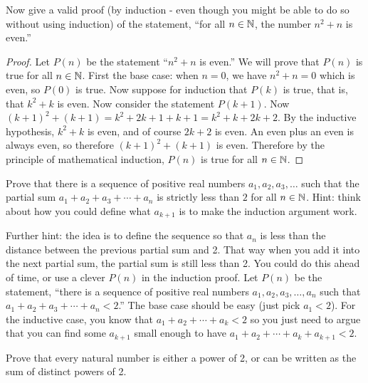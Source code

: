 \begin{questions}
  	
  	
  

\question Now give a valid proof (by induction - even though you might be able to do so without using induction) of the statement, ``for all $n \in \mathbb N$, the number $n^2 + n$ is even.''

	\begin{answer}
		  \begin{proof}
		    Let $P(n)$ be the statement ``$n^2 + n$ is even.''  We will prove that $P(n)$ is true for all $n \in \mathbb N$.  First the base case: when $n = 0$, we have $n^2 + n = 0$ which is even, so $P(0)$ is true.  Now suppose for induction that $P(k)$ is true, that is, that $k^2 + k$ is even.  Now consider the statement $P(k+1)$.  Now $(k+1)^2 + (k+1) = k^2 + 2k + 1 + k + 1 = k^2 + k + 2k + 2$.  By the inductive hypothesis, $k^2 + k$ is even, and of course $2k + 2$ is even.  An even plus an even is always even, so therefore $(k+1)^2 + (k+1)$ is even.  Therefore by the principle of mathematical induction, $P(n)$ is true for all $n \in \mathbb N$.
		  \end{proof}
	\end{answer}
	
	
	


\question Prove that there is a sequence of positive real numbers $a_1, a_2, a_3, \ldots$ such that the partial sum $a_1 + a_2 + a_3 + \cdots + a_n$ is strictly less than $2$ for all $n \in \mathbb N$.  Hint: think about how you could define what $a_{k+1}$ is to make the induction argument work.

	\begin{answer}
		 Further hint: the idea is to define the sequence so that $a_n$ is less than the distance between the previous partial sum and 2.  That way when you add it into the next partial sum, the partial sum is still less than 2.  You could do this ahead of time, or use a clever $P(n)$ in the induction proof.  Let $P(n)$ be the statement, ``there is a sequence of positive real numbers $a_1, a_2, a_3, \ldots, a_n$ such that $a_1 + a_2 + a_3 + \cdots + a_n < 2$.''  The base case should be easy (just pick $a_1 < 2$).  For the inductive case, you know that $a_1 + a_2 + \cdots + a_k < 2$ so you just need to argue that you can find some $a_{k+1}$ small enough to have $a_1 + a_2 + \cdots +a_k + a_{k+1} < 2$.
	\end{answer}
	
	
\question Prove that every natural number is either a power of 2, or can be written as the sum of distinct powers of 2.


\end{questions}
